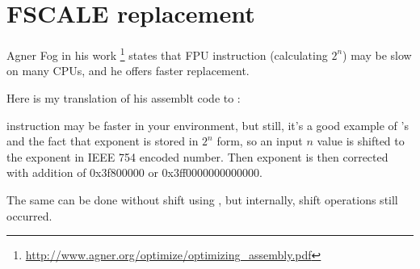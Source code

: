\section{FSCALE replacement}

Agner Fog in his  work
\footnote{\url{http://www.agner.org/optimize/optimizing_assembly.pdf}} states that  \ac{FPU} instruction
(calculating $2^n$) may be slow on many CPUs, and he offers faster replacement.

Here is my translation of his assemblt code to \CCpp:



 instruction may be faster in your environment, but still, it's a good example of 's and the fact
that exponent is stored in $2^n$ form,
so an input $n$ value is shifted to the exponent in IEEE 754 encoded number.
Then exponent is then corrected with addition of 0x3f800000 or 0x3ff0000000000000.

The same can be done without shift using , but internally, shift operations still occurred.

